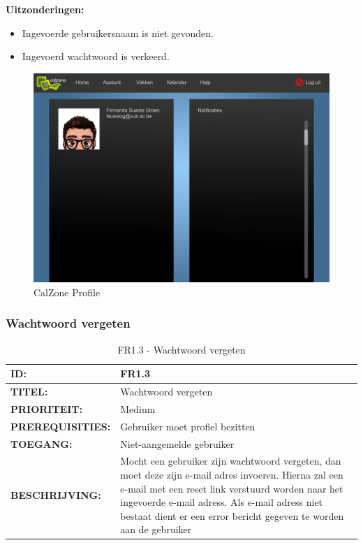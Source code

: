 \textbf{Uitzonderingen:}
\begin{itemize}
\item Ingevoerde gebruikersnaam is niet gevonden.
\item Ingevoerd wachtwoord is verkeerd.
\end{itemize}

\begin{center}
\begin{figure}[H]
\caption{CalZone Profile}
\centerline{\includegraphics[scale=0.4]{img/Calzoneprofile}}
\label{fig:CalZone Profile}
\end{figure}
\end{center}

\subsubsection{Wachtwoord vergeten}
\noindent\begin{table}[H]
            \begin{tabular}{l | p{10cm}}
                \textbf{ID:} & FR1.3 \\ \hline
                \textbf{TITEL:} & Wachtwoord vergeten \\ \hline
                \textbf{PRIORITEIT:} &  Medium \\ \hline
                \textbf{PREREQUISITIES:} & Gebruiker moet profiel bezitten\\ \hline
                \textbf{TOEGANG:} &  Niet-aangemelde gebruiker \\ \hline
                \textbf{BESCHRIJVING:} & Mocht een gebruiker zijn wachtwoord vergeten, dan moet deze zijn e-mail adres invoeren. 
                                        Hierna zal een e-mail met een reset link verstuurd worden naar het ingevoerde e-mail adress. 
                                        Als e-mail adress niet bestaat dient er een error bericht gegeven te worden aan de gebruiker\\
            \end{tabular}\\
            \caption{FR1.3 - Wachtwoord vergeten}
            \label{tab:FR1.3 - Wachtwoord vergeten}
        \end{table}

